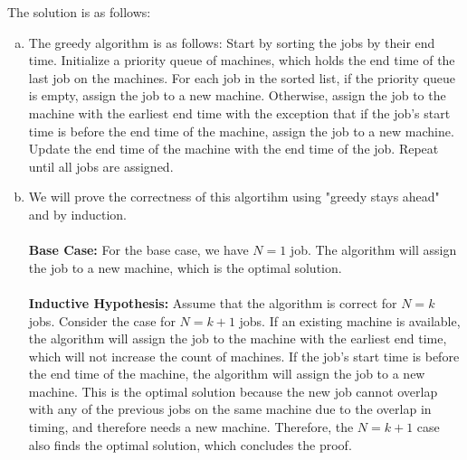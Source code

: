 \documentclass[10pt]{article}
\begin{document}
\begin{solution}
    The solution is as follows:
    \begin{enumerate}[(a)]
        \item The greedy algorithm is as follows:
        Start by sorting the jobs by their end time. Initialize a priority queue of machines, which holds the end time of the last job on the machines. For each job in the sorted list, if the priority queue is empty, assign the job to a new machine. Otherwise, assign the job to the machine with the earliest end time with the exception that if the job's start time is before the end time of the machine, assign the job to a new machine. Update the end time of the machine with the end time of the job. Repeat until all jobs are assigned.
        \item We will prove the correctness of this algortihm using "greedy stays ahead" and by induction. \\\\
        \textbf{Base Case:} For the base case, we have $N=1$ job. The algorithm will assign the job to a new machine, which is the optimal solution. \\\\
        \textbf{Inductive Hypothesis:} Assume that the algorithm is correct for $N=k$ jobs. Consider the case for $N=k+1$ jobs. If an existing machine is available, the algorithm will assign the job to the machine with the earliest end time, which will not increase the count of machines. If the job's start time is before the end time of the machine, the algorithm will assign the job to a new machine. This is the optimal solution because the new job cannot overlap with any of the previous jobs on the same machine due to the overlap in timing, and therefore needs a new machine. Therefore, the $N=k+1$ case also finds the optimal solution, which concludes the proof. \\\\
    \end{enumerate}
\end{solution}
\newpage


\end{document}
